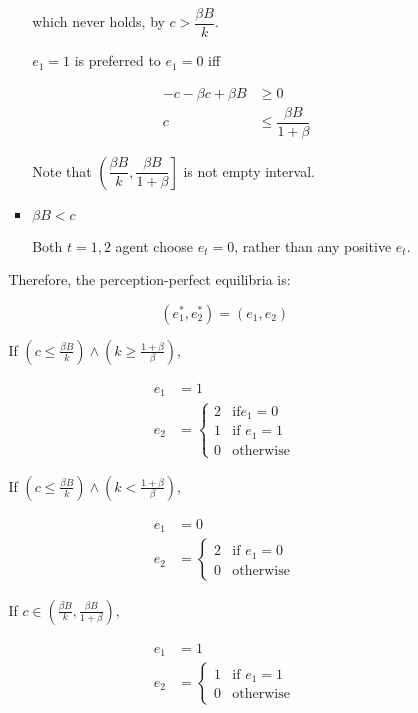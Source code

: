 \documentclass{jsarticle}
\begin{document}
\begin{enumerate}
\begin{enumerate}
\begin{itemize}
\begin{itemize}
which never holds, by $c>\dfrac{\beta B}{k}$.

$e_1=1$ is preferred to $e_1=0$ iff

\begin{align*}
-c - \beta c + \beta B &\geq 0 \\
c & \leq \dfrac{\beta B}{1+\beta}
\end{align*}

Note that $\left( \dfrac{\beta B}{k}, \dfrac{\beta B}{1+\beta} \right]$ is not empty interval.

\item $\beta B < c$

Both $t=1,2$ agent choose $e_t=0$, rather than any positive $e_t$.

\end{itemize}

\newpage

Therefore, the perception-perfect equilibria is:

\[(e_1^*, e_2^*)=(e_1,e_2) \]

If $(c \leq \frac{\beta B}{k}) \wedge (k \geq \frac{1+\beta}{\beta})$,

\begin{align*}
e_1 &=1 \\
e_2 &=\begin{cases}
2 & \text{if} e_1=0 \\
1 & \text{if } e_1=1 \\
0 & \text{otherwise}
\end{cases}
\end{align*}

If $(c \leq \frac{\beta B}{k}) \wedge (k < \frac{1+\beta}{\beta})$, 

\begin{align*}
e_1 &=0 \\
e_2 &=\begin{cases}
2 & \text{if } e_1=0 \\
0 & \text{otherwise}
\end{cases}
\end{align*}

If $c \in (\frac{\beta B}{k}, \frac{\beta B}{1+\beta})$,

\begin{align*}
e_1 &=1 \\
e_2 &=\begin{cases}
1 & \text{if } e_1=1 \\
0 & \text{otherwise}
\end{cases}
\end{align*}


\end{itemize}
\end{enumerate}
\end{enumerate}
\end{document}

